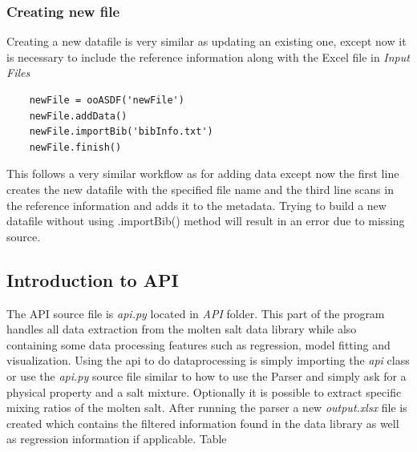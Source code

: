 \subsubsection{Creating new file}
Creating a new datafile is very similar as updating an existing one, except now it is necessary to include the reference information along with the Excel file in \textit{Input Files}

\begin{verbatim}
    newFile = ooASDF('newFile')
    newFile.addData()
    newFile.importBib('bibInfo.txt')
    newFile.finish()
\end{verbatim}
This follows a very similar workflow as for adding data except now the first line creates the new datafile with the specified file name and the third line scans in the reference information and adds it to the metadata. Trying to build a new datafile without using .importBib() method will result in an error due to missing source.

\subsection{Introduction to API}
The API source file is \textit{api.py} located in \textit{API} folder. This part of the program handles all data extraction from the molten salt data library while also containing some data processing features such as regression, model fitting and visualization. Using the api to do dataprocessing is simply importing the \textit{api} class or use the \textit{api.py} source file similar to how to use the Parser and simply ask for a physical property and a salt mixture. Optionally it is possible to extract specific mixing ratios of the molten salt. After running the parser a new \textit{output.xlsx} file is created which contains the filtered information found in the data library as well as regression information if applicable. Table 

